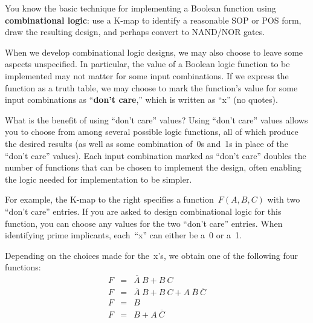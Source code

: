 You know the basic technique for implementing a Boolean function
using {\bf combinational logic}: use a \mbox{K-map} to identify a
reasonable SOP or POS form, draw the resulting design, and perhaps
convert to NAND/NOR gates.

\pagebreak

When we develop combinational logic designs, we may also choose to
leave some aspects unspecified.  In particular, the value of a
Boolean logic function to be implemented may not matter for some
input combinations.  If we express the function as a truth table,
we may choose to mark the function's value for some input combinations 
as ``{\bf don't care},'' which is written as ``x'' (no quotes).

What is the benefit of using ``don't care'' values?  
%
Using ``don't care'' values allows you to choose from among several
possible logic functions, all of which produce the desired results
(as well as some combination of~0s and~1s in place of the ``don't
care'' values).  
%
Each input combination marked as ``don't care'' doubles the number
of functions that can be chosen to implement the design, often enabling 
the logic needed for implementation to be simpler.

\begin{minipage}{5.25in}
For example, the \mbox{K-map} to the right specifies a function~$F(A,B,C)$
with two ``don't care'' entries.  
%
If you are asked to design combinational logic for this function,
you can
choose any values for the two ``don't care'' entries.  When identifying
prime implicants, each~``x'' can either be a~0 or a~1.
\end{minipage}\hspace{.25in}%
\begin{minipage}{1in}
\end{minipage}

\begin{minipage}{5.25in}
Depending on the choices made for the~x's, we obtain one of 
the following four functions:
%
\begin{eqnarray*}
F&=&\overline{A}~B+B~C\\
F&=&\overline{A}~B+B~C+A~\overline{B}~\overline{C}\\
F&=&B\\
F&=&B+A~\overline{C}\\
\end{eqnarray*}
\end{minipage}\hspace{.25in}%
\begin{minipage}{1in}
\end{minipage}

